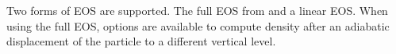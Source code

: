 Two forms of EOS are supported. The full EOS from \cite{Jackett_McDougall95jaot} and a linear EOS. When using the full EOS, options are available to compute density after an adiabatic displacement of the particle to a different vertical level.
